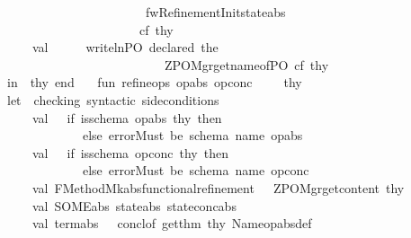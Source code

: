 \begin{isabellebody}
\ \ \ \ \ \ \ \ \ \ \ \ \ \ \ \ \ \ \ \ \ \ \ \ \ \ \ \ \ {\isachardoublequote}fwRefinementInit{\isachardoublequote}{\isacharcomma}state{\isacharunderscore}abs{\isacharparenright}\ \isanewline
\ \ \ \ \ \ \ \ \ \ \ \ \ \ \ \ \ \ \ \ \ \ \ \ \ \ \ \ cf\ thy\isanewline
\ \ \ \ \ \ \ \ \ \ \ val\ {\isacharunderscore}\ \ \ \ {\isacharequal}\ writeln{\isacharparenleft}{\isachardoublequote}PO\ declared{\isacharcolon}\ {\isachardoublequote}{\isacharcircum}{\isacharparenleft}the\isanewline
\ \ \ \ \ \ \ \ \ \ \ \ \ \ \ \ \ \ \ \ \ \ \ \ \ \ \ \ \ \ \ \ {\isacharparenleft}ZPO{\isacharunderscore}Mgr{\isachardot}get{\isacharunderscore}name{\isacharunderscore}of{\isacharunderscore}PO\ cf\ thy{\isacharprime}{\isacharparenright}{\isacharparenright}{\isacharparenright}\isanewline
\ \ \ \ \ \ \ in\ \ thy{\isacharprime}\ end\isanewline
\isanewline
\isanewline
\isanewline
\ \ \ fun\ refine{\isacharunderscore}ops\ {\isacharparenleft}op{\isacharunderscore}abs{\isacharcomma}\ op{\isacharunderscore}conc{\isacharparenright}\ \ \ \ \ thy\ {\isacharequal}\ \isanewline
\ \ \ \ \ \ \ let\ {\isacharparenleft}{\isacharasterisk}\ checking\ syntactic\ side{\isacharminus}conditions\ {\isachardot}{\isachardot}{\isachardot}\ {\isacharasterisk}{\isacharparenright}\isanewline
\ \ \ \ \ \ \ \ \ \ \ val\ {\isacharunderscore}\ {\isacharequal}\ if\ is{\isacharunderscore}schema\ op{\isacharunderscore}abs\ thy\ then\ {\isacharparenleft}{\isacharparenright}\isanewline
\ \ \ \ \ \ \ \ \ \ \ \ \ \ \ \ \ \ \ else\ error{\isacharparenleft}{\isachardoublequote}Must\ be\ schema\ name{\isacharcolon}\ {\isachardoublequote}{\isacharcircum}op{\isacharunderscore}abs{\isacharparenright}\isanewline
\ \ \ \ \ \ \ \ \ \ \ val\ {\isacharunderscore}\ {\isacharequal}\ if\ is{\isacharunderscore}schema\ op{\isacharunderscore}conc\ thy\ then\ {\isacharparenleft}{\isacharparenright}\isanewline
\ \ \ \ \ \ \ \ \ \ \ \ \ \ \ \ \ \ \ else\ error{\isacharparenleft}{\isachardoublequote}Must\ be\ schema\ name{\isacharcolon}\ {\isachardoublequote}{\isacharcircum}op{\isacharunderscore}conc{\isacharparenright}\isanewline
\ \ \ \ \ \ \ \ \ \ \ val\ FMethod{\isachardot}Mk{\isacharbraceleft}abs{\isacharcomma}functional{\isacharunderscore}refinement{\isacharbraceright}\ \ {\isacharequal}\ ZPO{\isacharunderscore}Mgr{\isachardot}get{\isacharunderscore}content\ thy\isanewline
\ \ \ \ \ \ \ \ \ \ \ val\ SOME{\isacharparenleft}abs{\isacharcomma}\ state{\isacharunderscore}abs{\isacharcomma}\ state{\isacharunderscore}conc{\isacharparenright}{\isacharequal}abs\isanewline
\ \ \ \ \ \ \ \ \ \ \ val\ term{\isacharunderscore}abs\ \ {\isacharequal}\ concl{\isacharunderscore}of\ {\isacharparenleft}get{\isacharunderscore}thm\ thy\ {\isacharparenleft}Name{\isacharparenleft}op{\isacharunderscore}abs{\isacharcircum}{\isachardoublequote}{\isacharunderscore}def{\isachardoublequote}{\isacharparenright}{\isacharparenright}{\isacharparenright}\ \isanewline

\end{isabellebody}
